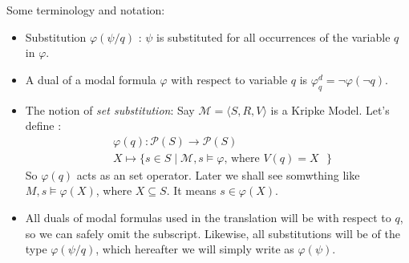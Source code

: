 \documentclass[10pt]{article}
\renewcommand{\phi}{\varphi}
\begin{document}
		Some terminology and notation:
		\begin{itemize}
			\item Substitution $\phi(\psi/q)$ : $\psi$ is substituted for all occurrences of the variable $q$ in $\phi$.
			\item A dual of a modal formula $\phi$ with respect to variable $q$ is $\phi_q^d = \neg\phi(\neg q)$.
			\item The notion of \textit{set substitution}: Say $\mathcal{M} = \langle S,R,V \rangle$ is a Kripke Model. Let's define : 
			\begin{equation} 
				\begin{split}
					& \phi(q) : \mathcal{P}(S) \rightarrow \mathcal{P}(S)\\
					& X \mapsto \{s \in S \mid \mathcal{M}, s \models \phi \text{, where $V(q) = X$ }\}
				\end{split}
			\end{equation} 
			So $\phi(q)$ acts as an set operator. Later we shall see somwthing like $M,s\models \phi(X)$, where $X\subseteq S$. It means $s\in \phi(X)$.
			
			\item  All duals of modal formulas used in the translation will be with respect to
			$q$, so we can safely omit the subscript. Likewise, all substitutions will be of
			the type $\phi(\psi/q)$, which hereafter we will simply write as $\phi(\psi)$.
		\end{itemize}
		
\end{document}
